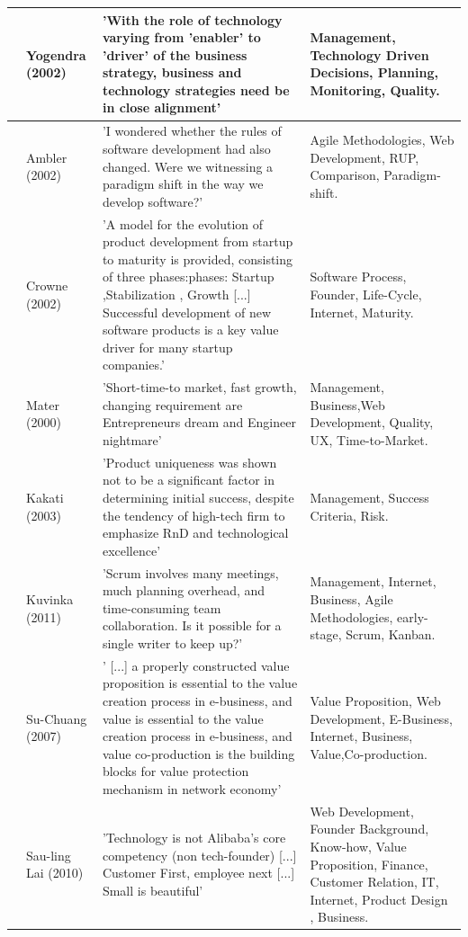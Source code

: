 \documentclass[final,5p,times,twocolumn]{elsarticle}
\begin{document}
\begin{longtable}{|p{0.2in}|p{0.8in}|p{2.5in}|p{1.4in}|}
\cite{Yogendra2002} & Yogendra (2002) & 'With the role of technology varying from 'enabler' to 'driver' of the business strategy, business and technology strategies need be in close alignment' & Management, Technology Driven Decisions, Planning, Monitoring, Quality. \\ \hline 
\cite{Ambler2002} & Ambler (2002) & 'I wondered whether the rules of software development had also changed. Were we witnessing a paradigm shift in the way we develop software?' & Agile Methodologies, Web Development, RUP, Comparison, Paradigm-shift. \\ \hline 
\cite{Crowne2002} & Crowne (2002) & 'A model for the evolution of product development from startup to maturity is provided, consisting of three phases:phases: Startup ,Stabilization , Growth [...] Successful development of new software products is a key value driver for many startup companies.' & Software Process,  Founder, Life-Cycle, Internet, Maturity. \\ \hline 
\cite{Mater2000} & Mater (2000) & 'Short-time-to market, fast growth, changing requirement are Entrepreneurs dream and Engineer nightmare' & Management, Business,Web Development, Quality, UX, Time-to-Market. \\ \hline 
\cite{Kakati2003} & Kakati (2003) & 'Product uniqueness was shown not to be a significant factor in determining initial success, despite the tendency of high-tech firm to emphasize RnD and technological excellence' & Management, Success Criteria, Risk. \\ \hline 
\cite{Kuvinka2011} & Kuvinka (2011) & 'Scrum involves many meetings, much planning overhead, and time-consuming team collaboration. Is it possible for a single writer to keep up?' & Management, Internet, Business, Agile Methodologies, early-stage, Scrum, Kanban. \\ \hline 
\cite{Su-Chan2007} & Su-Chuang (2007) & ' [...] a properly constructed value proposition is essential to the value creation process in e-business, and value is essential to the value creation process in e-business, and value co-production is the building blocks for value protection mechanism in network economy' & Value Proposition, Web Development, E-Business, Internet, Business, Value,Co-production. \\ \hline 
\cite{Lai2010} & Sau-ling Lai (2010) & 'Technology is not Alibaba's core competency (non tech-founder) [...] Customer First, employee next [...] Small is beautiful' & Web Development, Founder Background, Know-how, Value Proposition, Finance, Customer Relation, IT, Internet, Product Design , Business.\\ \hline 

\end{longtable}
\end{document}
